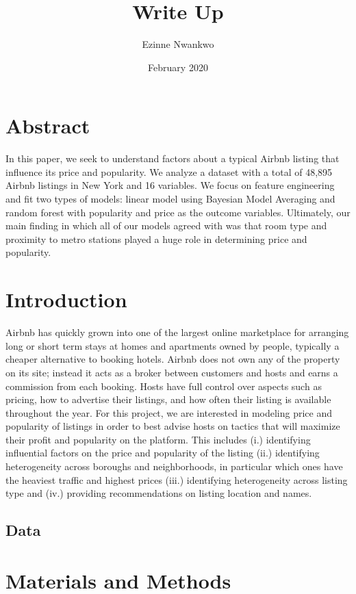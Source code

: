 \documentclass{article}
\title{Write Up}
\author{Ezinne Nwankwo}
\date{February 2020}
\begin{document}
\maketitle


\section{Abstract} 

In this paper, we seek to understand factors about a typical Airbnb listing that influence its price and popularity. We analyze a dataset with a total of 48,895 Airbnb listings in New York and 16 variables. We focus on feature engineering and fit two types of models: linear model using Bayesian Model Averaging and random forest with popularity and price as the outcome variables. Ultimately, our main finding in which all of our models agreed with was that room type and proximity to metro stations played a huge role in determining price and popularity. 

\section{Introduction}

Airbnb has quickly grown into one of the largest online marketplace for arranging long or short term stays at homes and apartments owned by people, typically a cheaper alternative to booking hotels. Airbnb does not own any of the property on its site; instead it acts as a broker between customers and hosts and earns a commission from each booking. Hosts have full control over aspects such as pricing, how to advertise their listings, and how often their listing is available throughout the year. For this project, we are interested in modeling price and popularity of listings in order to best advise hosts on tactics that will maximize their profit and popularity on the platform. This includes (i.) identifying influential factors on the price and popularity of the listing (ii.) identifying heterogeneity across boroughs and neighborhoods, in particular which ones have the heaviest traffic and highest prices (iii.) identifying heterogeneity across listing type and (iv.) providing recommendations on listing location and names. 

\subsection{Data} 



\section{Materials and Methods} 
\end{document}
